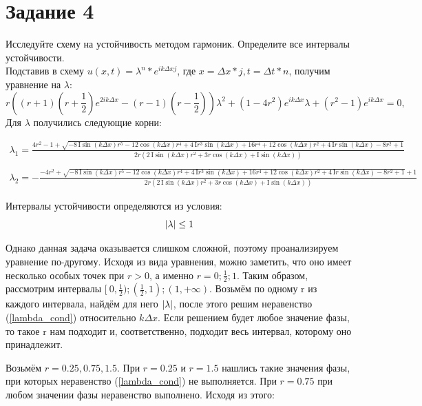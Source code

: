 \documentclass[a4paper, 14pt]{extreport}
\begin{document}
\section*{Задание 4}
Исследуйте схему на устойчивость методом гармоник. Определите все
интервалы устойчивости.\\
Подставив в схему $u(x,t) = \lambda^n*e^{ik\Delta x j}$, где $x = \Delta x * j, t = \Delta t * n$, получим уравнение на $\lambda$:
\begin{equation}
	\label{lambda_eq}
	r((r+1)(r+\frac{1}{2})e^{2ik\Delta x} - (r-1)(r-\frac{1}{2}))\lambda^2 + (1-4r^2)e^{ik\Delta x}\lambda + (r^2-1)e^{ik\Delta x} = 0,
\end{equation}
Для $\lambda$ получились следующие корни:\\
\begin{scriptsize}
\begin{eqnarray}
\label{lambdas}
\lambda_1 = \frac{4 r^{2}-1+\sqrt{-8 \,\mathrm{I} \sin \! \left(k \Delta x  \right) r^{5}-12 \cos \! \left(k \Delta x  \right) r^{4}+4 \,\mathrm{I} r^{3} \sin \! \left(k \Delta x  \right)+16 r^{4}+12 \cos \! \left(k \Delta x  \right) r^{2}+4 \,\mathrm{I} r \sin \! \left(k \Delta x  \right)-8 r^{2}+1}}{2 r \left(2 \,\mathrm{I} \sin \! \left(k \Delta x  \right) r^{2}+3 r \cos \! \left(k \Delta x  \right)+\mathrm{I} \sin \! \left(k \Delta x  \right)\right)}
\\\nonumber\\\lambda_2 = -\frac{-4 r^{2}+\sqrt{-8 \,\mathrm{I} \sin \! \left(k \Delta x  \right) r^{5}-12 \cos \! \left(k \Delta x  \right) r^{4}+4 \,\mathrm{I} r^{3} \sin \! \left(k \Delta x  \right)+16 r^{4}+12 \cos \! \left(k \Delta x  \right) r^{2}+4 \,\mathrm{I} r \sin \! \left(k \Delta x  \right)-8 r^{2}+1}+1}{2 r \left(2 \,\mathrm{I} \sin \! \left(k \Delta x  \right) r^{2}+3 r \cos \! \left(k \Delta x  \right)+\mathrm{I} \sin \! \left(k \Delta x  \right)\right)}
\end{eqnarray}
\end{scriptsize}

\par Интервалы устойчивости определяются из условия:
\begin{equation}
	\label{lambda_cond}
	\abs{\lambda} \le 1
\end{equation}

\par Однако данная задача оказывается слишком сложной, поэтому проанализируем уравнение по-другому. Исходя из вида уравнения, можно заметить, что оно имеет несколько особых точек при $r > 0$, а именно $r = 0; \frac{1}{2}; 1$. Таким образом, рассмотрим интервалы $[\ 0, \frac{1}{2}); (\frac{1}{2}, 1); (1, +\infty)$. Возьмём по одному r из каждого интервала, найдём для него $\abs{\lambda}$, после этого решим неравенство (\ref{lambda_cond}) относительно $k\Delta x$. Если решением будет любое значение фазы, то такое r нам подходит и, соответственно, подходит весь интервал, которому оно принадлежит.
\par Возьмём $r = 0.25, 0.75, 1.5$. 
При $r = 0.25$ и $r = 1.5$ нашлись такие значения фазы, при которых неравенство (\ref{lambda_cond}) не выполняется. При $r = 0.75$ при любом значении фазы неравенство выполнено. Исходя из этого:
\end{document}
